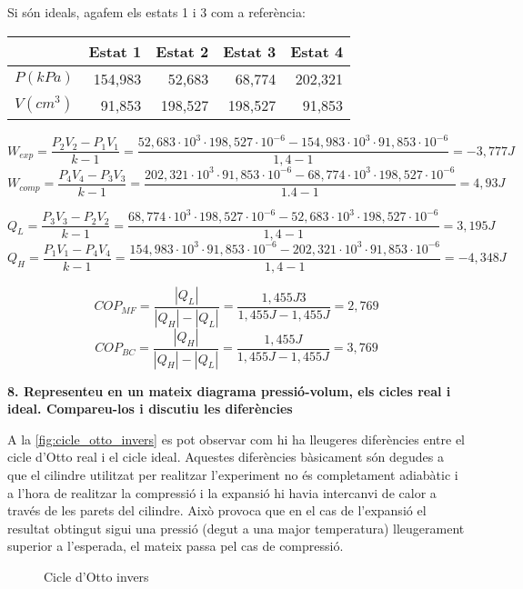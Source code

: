 \documentclass[a4paper]{article}
\begin{document}
Si són ideals, agafem els estats 1 i 3 com a referència:

\begin{center}
	\begin{tabular}{l|rrrr}
		& Estat 1 & Estat 2 & Estat 3 & Estat 4 \\
		\hline
		$P(kPa)$ & 154,983 & 52,683  & 68,774 &  202,321 \\
		$V(cm^3)$ & 91,853 & 198,527 & 198,527 & 91,853 \\
	\end{tabular}
\end{center}

$$ W_{exp} = \frac{P_2 V_2 - P_1 V_1}{k - 1} = 
\frac{52,683·10^3 · 198,527·10^{-6} - 154,983·10^3 · 91,853·10^{-6}}{1,4 - 1} =
\boxed{-3,777J} 
$$
$$ W_{comp} = \frac{P_4 V_4 - P_3 V_3}{k - 1} = 
\frac{202,321·10^3 · 91,853·10^{-6} - 68,774·10^3 · 198,527·10^{-6}}{1.4 - 1} =
\boxed{4,93J}
$$

$$ Q_L = \frac{P_3 V_3 - P_2 V_2}{k - 1} = 
\frac{68,774·10^3 · 198,527·10^{-6} - 52,683·10^3 · 198,527·10^{-6}}{1,4 - 1} = 
\boxed{3,195J}
$$
$$ Q_H = \frac{P_1 V_1 - P_4 V_4}{k - 1} =
\frac{154,983·10^3 · 91,853·10^{-6} - 202,321·10^3 · 91,853·10^{-6}}{1,4 - 1} =
\boxed{-4,348J}
$$

$$ 
COP_{MF} = \frac{|Q_L|}{|Q_H| - |Q_L|} =
\frac{1,455J3}{1,455J - 1,455J} = \boxed{2,769} 
$$
$$ 
COP_{BC} = \frac{|Q_H|}{|Q_H| - |Q_L|} =
\frac{1,455J}{1,455J - 1,455J} = \boxed{3,769} 
$$

\textbf{8. Representeu en un mateix diagrama pressió-volum, els cicles real i ideal. Compareu-los i discutiu les diferències}

A la \autoref{fig:cicle_otto_invers} es pot observar com hi ha lleugeres diferències entre el cicle d'Otto real i el cicle ideal. Aquestes diferències bàsicament són degudes a que el cilindre utilitzat per realitzar l'experiment no és completament adiabàtic i a l'hora de realitzar la compressió i la expansió hi havia intercanvi de calor a través de les parets del cilindre. Això provoca que en el cas de l'expansió el resultat obtingut sigui una pressió (degut a una major temperatura) lleugerament superior a l'esperada, el mateix passa pel cas de compressió.

\begin{figure}[H]
    \centering
    \caption{Cicle d'Otto invers}
    \label{fig:cicle_otto_invers}
\end{figure}
\end{document}
